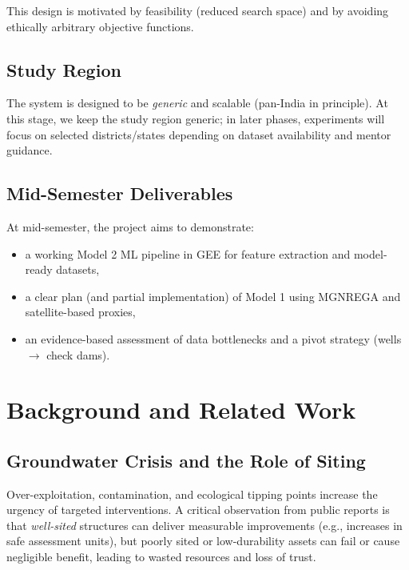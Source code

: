 \documentclass[12pt,a4paper]{report}
\begin{document}
This design is motivated by feasibility (reduced search space) and by avoiding ethically arbitrary objective functions.

\section{Study Region}
The system is designed to be \textit{generic} and scalable (pan-India in principle). At this stage, we keep the study region generic; in later phases, experiments will focus on selected districts/states depending on dataset availability and mentor guidance.

\section{Mid-Semester Deliverables}
At mid-semester, the project aims to demonstrate:
\begin{itemize}
  \item a working Model 2 ML pipeline in GEE for feature extraction and model-ready datasets,
  \item a clear plan (and partial implementation) of Model 1 using MGNREGA and satellite-based proxies,
  \item an evidence-based assessment of data bottlenecks and a pivot strategy (wells $\rightarrow$ check dams).
\end{itemize}

\chapter{Background and Related Work}
\section{Groundwater Crisis and the Role of Siting}
Over-exploitation, contamination, and ecological tipping points increase the urgency of targeted interventions. A critical observation from public reports is that \textit{well-sited} structures can deliver measurable improvements (e.g., increases in safe assessment units), but poorly sited or low-durability assets can fail or cause negligible benefit, leading to wasted resources and loss of trust.
\end{document}
